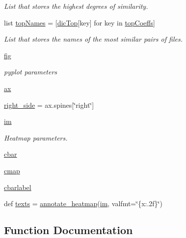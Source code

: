 \begin{DoxyCompactItemize}
\begin{DoxyCompactList}\small\item\em List that stores the highest degrees of similarity. \end{DoxyCompactList}\item 
list \hyperlink{namespacemain_back_adb3e6c6208b05db53a12bcb112a675b6}{top\+Names} = \mbox{[}\hyperlink{namespacemain_back_a14e7fa3decf3555d9fd28beaae5657fc}{dic\+Top}\mbox{[}key\mbox{]} for key in \hyperlink{namespacemain_back_a23114ee3f0a053386332a41a4bfc8107}{top\+Coeffs}\mbox{]}
\begin{DoxyCompactList}\small\item\em List that stores the names of the most similar pairs of files. \end{DoxyCompactList}\item 
\hyperlink{namespacemain_back_ae2547d943b7148a0226f3c43b2cbe697}{fig}
\begin{DoxyCompactList}\small\item\em pyplot parameters \end{DoxyCompactList}\item 
\hyperlink{namespacemain_back_a38c2a7421333f3468e902a87b6e93173}{ax}
\item 
\hyperlink{namespacemain_back_a89f7ed0e1ede7fd343133ceeede73230}{right\+\_\+side} = ax.\+spines\mbox{[}\char`\"{}right\char`\"{}\mbox{]}
\item 
\hyperlink{namespacemain_back_a2aabdc9357aa71da0c092014593e643e}{im}
\begin{DoxyCompactList}\small\item\em Heatmap parameters. \end{DoxyCompactList}\item 
\hyperlink{namespacemain_back_ad1570e07f6c2172680fb6e795e7004c4}{cbar}
\item 
\hyperlink{namespacemain_back_aa2bb4cddc5109d85e75c990ec1246cfc}{cmap}
\item 
\hyperlink{namespacemain_back_ae03335898c52325fcc32d469cb1a3222}{cbarlabel}
\item 
def \hyperlink{namespacemain_back_a562674cbc45c1f945d00bcde6607f2e7}{texts} = \hyperlink{namespacemain_back_a7ad3aabd2ea6412049ac675944201dfa}{annotate\+\_\+heatmap}(\hyperlink{namespacemain_back_a2aabdc9357aa71da0c092014593e643e}{im}, valfmt=\char`\"{}\{x\+:.\+2f\}\char`\"{})
\end{DoxyCompactItemize}


\subsection{Function Documentation}
\mbox{\label{namespacemain_back_a7ad3aabd2ea6412049ac675944201dfa}} 
